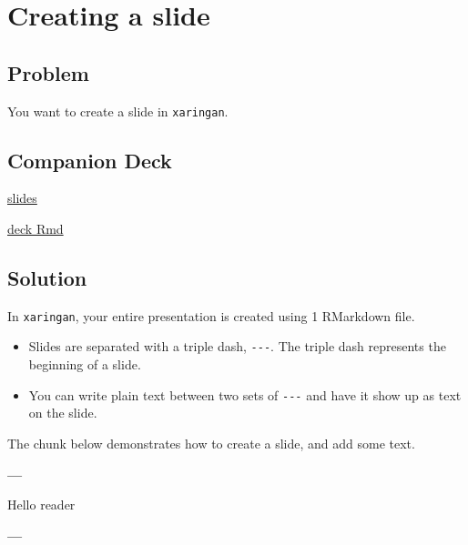 \documentclass[]{book}
\newenvironment{Shaded}{\begin{snugshade}}{\end{snugshade}}
\newcommand{\NormalTok}[1]{#1}
\newcommand{\OperatorTok}[1]{\textcolor[rgb]{0.81,0.36,0.00}{\textbf{#1}}}
\theoremstyle{definition}
\theoremstyle{definition}
\theoremstyle{definition}
\theoremstyle{remark}
\begin{document}
\hypertarget{creating-a-slide}{%
\chapter{Creating a slide}\label{creating-a-slide}}

\hypertarget{problem-2}{%
\section{Problem}\label{problem-2}}

You want to create a slide in \texttt{xaringan}.

\hypertarget{companion-deck-2}{%
\section{Companion Deck}\label{companion-deck-2}}

\href{http://xaringan-field-guide-companion.davisvaughan.com/03-creating-a-slide/creating-a-slide.html\#1}{slides}

\href{https://github.com/DavisVaughan/xaringanrecipes-companion/tree/master/03-creating-a-slide}{deck
Rmd}

\hypertarget{solution-2}{%
\section{Solution}\label{solution-2}}

In \texttt{xaringan}, your entire presentation is created using 1
RMarkdown file.

\begin{itemize}
\item
  Slides are separated with a triple dash, \texttt{-\/-\/-}. The triple
  dash represents the beginning of a slide.
\item
  You can write plain text between two sets of \texttt{-\/-\/-} and have
  it show up as text on the slide.
\end{itemize}

The chunk below demonstrates how to create a slide, and add some text.

\begin{Shaded}
\begin{Highlighting}[]
\OperatorTok{---}

\NormalTok{Hello reader}

\OperatorTok{---}
\end{Highlighting}
\end{Shaded}
\end{document}
